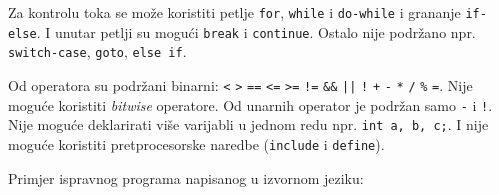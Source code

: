 Za kontrolu toka se može koristiti petlje \texttt{for}, \texttt{while} i \texttt{do-while} i grananje \texttt{if-else}. 
I unutar petlji su mogući \texttt{break} i \texttt{continue}.
Ostalo nije podržano npr. \texttt{switch-case}, \texttt{goto}, \texttt{else if}.

Od operatora su podržani binarni: \texttt{<}  \texttt{>}  \texttt{==}  \texttt{<=}  \texttt{>=}  \texttt{!=}  \texttt{\&\&}  \texttt{||}  \texttt{!}  \texttt{+}  \texttt{-}  \texttt{*}  \texttt{/}  \texttt{\%}  \texttt{=}. Nije moguće koristiti \emph{bitwise} operatore. Od unarnih operator je podržan samo \texttt{-} i \texttt{!}. Nije moguće deklarirati više varijabli u jednom redu npr.
\texttt{int a, b, c;}. I nije moguće koristiti pretprocesorske naredbe (\texttt{include} i \texttt{define}).

Primjer ispravnog programa napisanog u izvornom jeziku:



